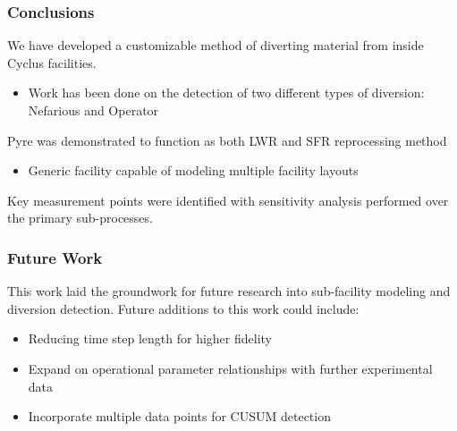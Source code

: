 \begin{frame}
\frametitle{Conclusions}
We have developed a customizable method of diverting material
from inside Cyclus facilities.
\begin{itemize}
	\item Work has been done on the detection of two
	different types of diversion: Nefarious and Operator
\end{itemize}
Pyre was demonstrated to function as both LWR and SFR
reprocessing method
\begin{itemize}
	\item Generic facility capable of modeling multiple facility layouts
\end{itemize}
Key measurement points were identified with sensitivity analysis performed over the primary sub-processes.
\end{frame}

\begin{frame}
\frametitle{Future Work}
This work laid the groundwork for future research into sub-facility modeling and diversion detection. Future additions to this work could include:
\begin{itemize}
	\item Reducing time step length for higher fidelity
	\item Expand on operational parameter relationships with further experimental data
	\item Incorporate multiple data points for CUSUM detection
\end{itemize}
\end{frame}